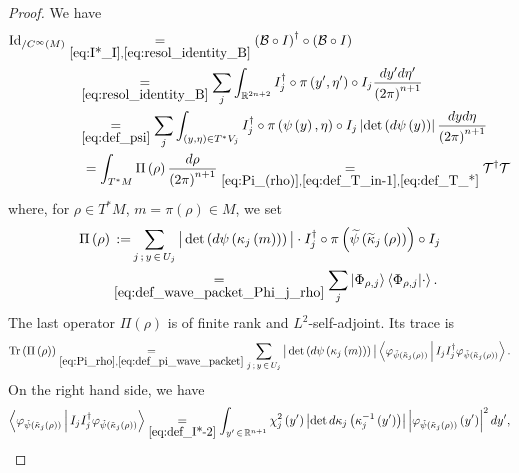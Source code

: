 \documentclass[10pt]{amsart}
\theoremstyle{definition}\newtheorem{defi}[theo]{Definition}\newtheorem{rema}[theo]{Remark}\newtheorem{exam}[theo]{Example}\newtheorem{exem}[theo]{Example}\newtheorem{nota}[theo]{Notation}
\newcommand{\clT}{\mathcal{T}}
\newcommand{\clB}{\mathcal{B}}
\newcommand{\Id}{\mathrm{Id}}
\newcommand{\Tr}{\mathrm{Tr}}
\newcommand{\bbR}{\mathbb{R}}
\let\oldtilde\tilde
\renewcommand*{\tilde}[1]{\mathchoice{\widetilde{#1}}{\widetilde{#1}}{\oldtilde{#1}}{\oldtilde{#1}}}
\begin{document}
\begin{proof}
We have
\begin{equation}\label{eq:res_id-1}
\begin{split}
\Id _{/C^{\infty}\left(M\right)} & \underset{\eqref{eq:I*_I},\eqref{eq:resol_identity_B}}{=}\left(\clB\circ I\right)^{\dagger}\circ\left(\clB\circ I\right)
\\
& \mkern16mu\underset{\eqref{eq:resol_identity_B}}{=}\sum_{j}\int_{\bbR^{2n+2}}I_{j}^{\dagger}\circ\pi\left(y',\eta'\right)\circ I_{j}\frac{dy'd\eta'}{\left(2\pi\right)^{n+1}}\\
& \mkern16mu\underset{\eqref{eq:def_psi}}{=}\sum_{j}\int_{\left(y,\eta\right)\in T^{*}V_{j}}I_{j}^{\dagger}\circ\pi\left(\psi\left(y\right),\eta\right)\circ I_{j}\left|\det \left(d\psi\left(y\right)\right)\right|\frac{dyd\eta}{\left(2\pi\right)^{n+1}} \\
& \mkern22mu=\int_{T^{*}M}\Pi\left(\rho\right)\frac{d\rho}{\left(2\pi\right)^{n+1}}\underset{
\eqref{eq:Pi_(rho)},\eqref{eq:def_T_in-1},\eqref{eq:def_T_*}}{=} \clT^{\dagger}\clT
\end{split}
\end{equation}
where, for $\rho\in T^{*}M$, $m=\pi(\rho)\in M$, we set
\begin{equation}\label{eq:Pi_rho}
\begin{split}
\Pi\left(\rho\right) &\mkern8mu{:=}\sum_{j\,;\,y\,\in\,U_{j}}\big|\det \left(d\psi\left(\kappa_{j}\left(m\right)\right)\right)\big|\cdot I_{j}^{\dagger}\circ\pi\left(\tilde{\psi}\left(\tilde{\kappa}_{j}\left(\rho\right)\right)\right)\circ I_{j}
\\
&\underset{\eqref{eq:def_wave_packet_Phi_j_rho}}{=}\sum_{j}\left|\Phi_{\rho,j}\right\rangle\left\langle\Phi_{\rho,j}|\cdot\right\rangle.
\end{split}
\end{equation}
The last operator $\Pi(\rho)$ is of finite rank and $L^{2}$-self-adjoint. Its trace is
\begin{equation}\label{eq:eq}
\Tr\left(\Pi\left(\rho\right)\right)\underset{\eqref{eq:Pi_rho},\eqref{eq:def_pi_wave_packet}}{=} \sum_{j\,;\,y\,\in \,U_{j}}\big|\det \left(d\psi\left(\kappa_{j}\left(m\right)\right)\right)\big|\left\langle\varphi_{\tilde{\psi}\left(\tilde{\kappa}_{j}\left(\rho\right)\right)}\,\middle|\,I_{j}I_{j}^{\dagger}\varphi_{\tilde{\psi}\left(\tilde{\kappa}_{j}\left(\rho\right)\right)}\right\rangle.
\end{equation}
On the right hand side, we have
\begin{align*}
\left\langle\varphi_{\tilde{\psi}\left(\tilde{\kappa}_{j}\left(\rho\right)\right)}\,\middle|\,I_{j}I_{j}^{\dagger}\varphi_{\tilde{\psi}\left(\tilde{\kappa}_{j}\left(\rho\right)\right)}\right\rangle & \underset{\eqref{eq:def_I*-2}}{=}\int_{y'\,\in\,\bbR^{n+1}}\chi_{j}^{2}\left(y'\right)\left|\det d\kappa_{j}\left(\kappa_{j}^{-1}\left(y'\right)\right)\right|\left|\varphi_{\tilde{\psi}\left(\tilde{\kappa}_{j}\left(\rho\right)\right)}\left(y'\right)\right|^{2}dy',\\

\end{align*}
\end{proof}
\end{document}
